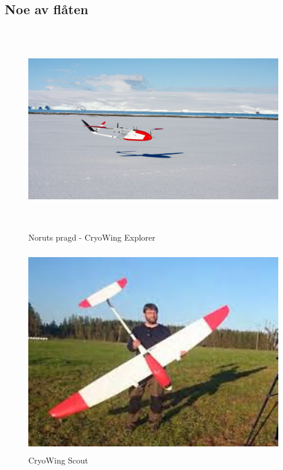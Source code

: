 \documentclass[12pt, a4paper]{article}
\begin{document}
\subsection{Noe av flåten}
\begin{figure}[hpbt]
	\centering
	\includegraphics[width=.6\textwidth, height=9cm]{bilder/CryoWing_Explorer.jpeg}
	\caption[CryoWing Explorer]{Noruts pragd - CryoWing Explorer}
\end{figure}

\begin{figure}[h!]
	\centering
	\includegraphics[width=.6\textwidth, height=9cm]{bilder/CryoWing_Scout.jpeg}
	\caption{CryoWing Scout}
\end{figure}

\newpage
\end{document}

